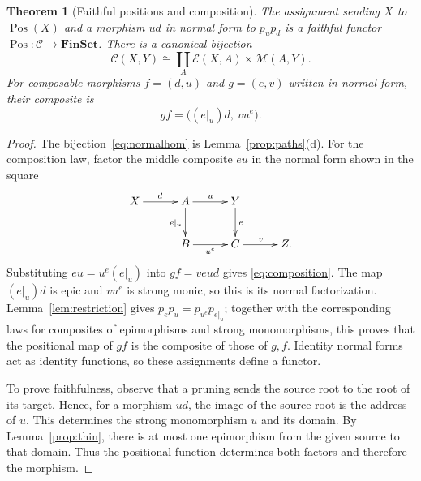 \documentclass[11pt,a4paper]{article}
\theoremstyle{plain}
\newtheorem{theorem}{Theorem}[section]
\theoremstyle{definition}
\theoremstyle{remark}
\newcommand{\C}{\mathcal C}
\newcommand{\Ocat}{\mathcal M}
\newcommand{\Dcat}{\mathcal E}
\newcommand{\Pos}{\operatorname{Pos}}
\begin{document}
\begin{theorem}[Faithful positions and composition]\label{thm:positions}
The assignment sending $X$ to $\Pos(X)$ and a morphism $ud$
in normal form to $p_up_d$ is a faithful functor
$\Pos:\C\to\mathbf{FinSet}$. There is a canonical bijection
\begin{equation}\label{eq:normalhom}
 \C(X,Y)\cong\coprod_A\Dcat(X,A)\times\Ocat(A,Y).
\end{equation}
For composable morphisms $f=(d,u)$ and $g=(e,v)$ written in
normal form, their composite is
\begin{equation}\label{eq:composition}
gf=\bigl((e|_u)d,\ vu^e\bigr).
\end{equation}
\end{theorem}
\begin{proof}
The bijection~\eqref{eq:normalhom} is Lemma~\ref{prop:paths}(d).
For the composition law, factor the middle composite $eu$ in
the normal form shown in the square
\[
\xymatrix@C=3em@R=2.5em{
X\ar[r]^d&A\ar[r]^u\ar[d]_{e|_u}&Y\ar[d]^e&\\
&B\ar[r]_{u^e}&C\ar[r]^v&Z.
}
\]
Substituting $eu=u^e(e|_u)$ into $gf=veud$ gives
\eqref{eq:composition}.
The map $(e|_u)d$ is epic and $vu^e$ is strong monic, so this is
its normal factorization. Lemma~\ref{lem:restriction} gives
$p_ep_u=p_{u^e}p_{e|_u}$; together with the corresponding laws
for composites of epimorphisms and strong monomorphisms, this proves
that the positional map of $gf$ is the composite of those of $g,f$.
Identity normal forms act as identity functions, so these
assignments define a functor.

To prove faithfulness, observe that a pruning sends the source
root to the root of its target. Hence, for a morphism $ud$, the
image of the source root is the address of $u$. This determines
the strong monomorphism $u$ and its domain. By
Lemma~\ref{prop:thin}, there is at most one epimorphism from
the given source to that domain. Thus the positional function
determines both factors and therefore the morphism.
\end{proof}
\end{document}
